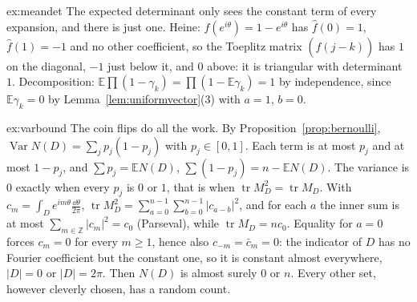 \begin{solution}{ex:meandet}
\idea The expected determinant only sees the constant term of every expansion, and there is just one.
\writeup Heine: $f(e^{i\theta})=1-e^{i\theta}$ has $\hat f(0)=1$, $\hat f(1)=-1$ and no other coefficient, so the Toeplitz matrix $(\hat f(j-k))$ has $1$ on the diagonal, $-1$ just below it, and $0$ above: it is triangular with determinant
$1$. Decomposition: $\mathbb E\prod(1-\gamma_k)=\prod(1-\mathbb E\gamma_k)=1$ by independence, since $\mathbb E\gamma_k=0$ by Lemma~\ref{lem:uniformvector}(3) with $a=1$, $b=0$.
\end{solution}

\begin{solution}{ex:varbound}
\idea The coin flips do all the work.
\writeup By Proposition~\ref{prop:bernoulli}, $\operatorname{Var}N(D)=\sum_jp_j(1-p_j)$ with $p_j\in[0,1]$. Each term is at most $p_j$ and at most $1-p_j$, and $\sum p_j=\mathbb EN(D)$, $\sum(1-p_j)=n-\mathbb EN(D)$. The variance is $0$ exactly when
every $p_j$ is $0$ or $1$, that is when $\operatorname{tr}M_D^2=\operatorname{tr}M_D$. With $c_m=\int_De^{im\theta}\frac{\dd\theta}{2\pi}$, $\operatorname{tr}M_D^2=\sum_{a=0}^{n-1}\sum_{b=0}^{n-1}|c_{a-b}|^2$, and for each $a$ the inner sum is at most $\sum_{m\in\mathbb Z}|c_m|^2=c_0$ (Parseval), while
$\operatorname{tr}M_D=nc_0$. Equality for $a=0$ forces $c_m=0$ for every $m\ge1$, hence also $c_{-m}=\bar c_m=0$: the indicator of $D$ has no Fourier coefficient but the constant one, so it is constant almost everywhere, $|D|=0$ or $|D|=2\pi$. Then $N(D)$ is almost surely $0$ or $n$. Every other set, however cleverly chosen, has a random count.
\end{solution}

